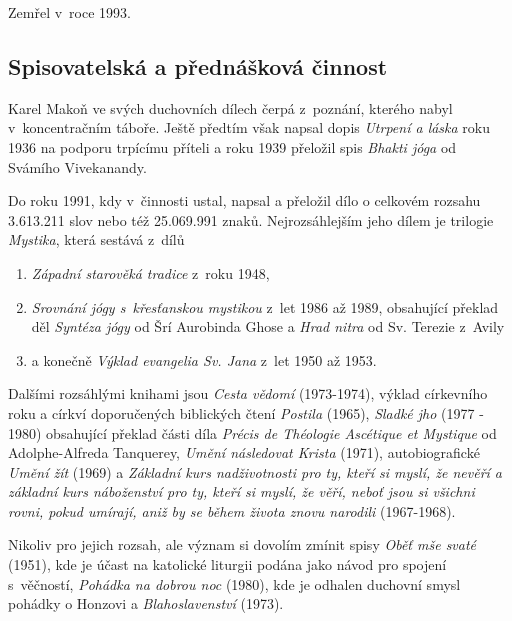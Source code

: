 Zemřel v~roce 1993.

\subsection{Spisovatelská a přednášková činnost}

Karel Makoň ve svých duchovních dílech čerpá z~poznání, kterého nabyl
v~koncentračním táboře. Ještě předtím však napsal dopis {\em Utrpení a láska}
roku 1936 na podporu trpícímu příteli a roku 1939 přeložil spis {\em Bhakti
jóga}\cite{vivekananda2003bhakti} od Svámího Vivekanandy.

Do roku 1991, kdy v~činnosti ustal, napsal a přeložil dílo o celkovém rozsahu
3.613.211 slov nebo též 25.069.991 znaků. Nejrozsáhlejším jeho dílem je trilogie
{\em Mystika}, která sestává z~dílů
\begin{enumerate}
\item{{\em Západní starověká tradice} z~roku 1948,}
\item{
    {\em Srovnání jógy s~křesťanskou mystikou}
    z~let 1986 až 1989, obsahující překlad děl
    {\em Syntéza jógy}\cite{aurobindo1999synthesis} od Šrí Aurobinda Ghose
    a {\em Hrad nitra}\cite{teresa1588interior} od Sv. Terezie z~Avily
}
\item{a konečně {\em Výklad evangelia Sv. Jana} z~let 1950 až 1953.}
\end{enumerate}

Dalšími rozsáhlými knihami jsou {\em Cesta vědomí} (1973-1974),
výklad církevního roku a církví doporučených biblických čtení
{\em Postila} (1965),
{\em Sladké jho} (1977 - 1980) obsahující překlad části díla
{\em Précis de Théologie Ascétique et Mystique}
od Adolphe-Alfreda Tanquerey,
{\em Umění následovat Krista} (1971),
autobiografické {\em Umění žít} (1969)
a {\em Základní kurs nadživotnosti pro ty, kteří si myslí, že nevěří a základní
kurs náboženství pro ty, kteří si myslí, že věří, neboť jsou si všichni rovni,
pokud umírají, aniž by se během života znovu narodili} (1967-1968).

Nikoliv pro jejich rozsah, ale význam si dovolím zmínit spisy
{\em Oběť mše svaté} (1951), kde je účast na katolické liturgii podána jako
návod pro spojení s~věčností,
{\em Pohádka na dobrou noc} (1980), kde je odhalen duchovní smysl pohádky o
Honzovi
a {\em Blahoslavenství} (1973).

